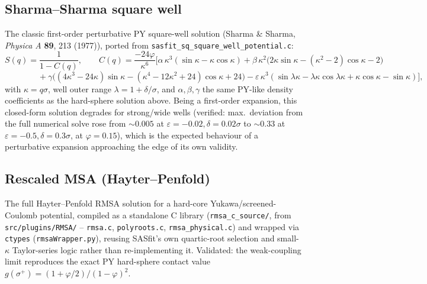 \documentclass[11pt,a4paper]{article}
\newcommand{\code}[1]{\texttt{#1}}
\begin{document}
\subsection{Sharma--Sharma square well}
\label{sec:sharma-sharma}
The classic first-order perturbative PY square-well solution (Sharma \& Sharma,
\emph{Physica A} \textbf{89}, 213 (1977)), ported from
\code{sasfit\_sq\_square\_well\_potential.c}:
\begin{equation}
  S(q) = \frac{1}{1-C(q)}, \qquad
  C(q) = \frac{-24\varphi}{\kappa^6}\Big[\alpha\,\kappa^3(\sin\kappa-\kappa\cos\kappa)
    + \beta\,\kappa^2\big(2\kappa\sin\kappa-(\kappa^2{-}2)\cos\kappa-2\big)
\end{equation}
\begin{equation}
  \qquad\qquad + \gamma\big((4\kappa^3{-}24\kappa)\sin\kappa-(\kappa^4{-}12\kappa^2{+}24)\cos\kappa+24\big)
    - \varepsilon\,\kappa^3(\sin\lambda\kappa-\lambda\kappa\cos\lambda\kappa+\kappa\cos\kappa-\sin\kappa)\Big],
\end{equation}
with $\kappa=q\sigma$, well outer range $\lambda=1+\delta/\sigma$, and
$\alpha,\beta,\gamma$ the same PY-like density coefficients as the hard-sphere
solution above. Being a first-order expansion, this closed-form solution
degrades for strong/wide wells (verified: max.\ deviation from the full
numerical solve rose from $\sim0.005$ at $\varepsilon=-0.02,\delta=0.02\sigma$
to $\sim0.33$ at $\varepsilon=-0.5,\delta=0.3\sigma$, at $\varphi=0.15$), which
is the expected behaviour of a perturbative expansion approaching the edge of
its own validity.

\subsection{Rescaled MSA (Hayter--Penfold)}
\label{sec:hayter-penfold}
The full Hayter--Penfold RMSA solution for a hard-core Yukawa/screened-Coulomb
potential, compiled as a standalone C library (\code{rmsa\_c\_source/}, from
\code{src/plugins/RMSA/} -- \code{rmsa.c}, \code{polyroots.c},
\code{rmsa\_physical.c}) and wrapped via
\code{ctypes} (\code{rmsaWrapper.py}), reusing SASfit's own quartic-root
selection and small-$\kappa$ Taylor-series logic rather than re-implementing
it. Validated: the weak-coupling limit reproduces the exact PY hard-sphere
contact value $g(\sigma^+)=(1+\varphi/2)/(1-\varphi)^2$.
\end{document}
